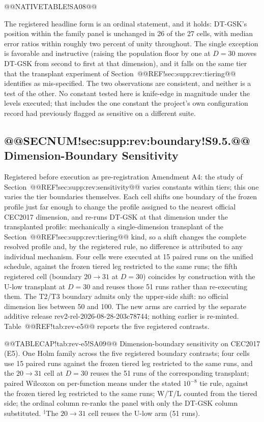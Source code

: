 \documentclass[10pt,a4paper]{article}
\newcommand{\dtgsk}{DT-GSK}
\begin{document}
@@NATIVETABLE!SA08@@




The registered headline form is an ordinal statement, and it holds: \dtgsk{}'s
position within the family panel is unchanged in 26 of the 27 cells, with median
error ratios within roughly two percent of unity throughout.  The single
exception is favorable and instructive (raising the population floor by one
at $D = 30$ moves \dtgsk{} from second to first at that dimension), and it
falls on the same tier that the transplant experiment of
Section~@@REF!sec:supp:rev:tiering@@ identifies as mis-specified.  The two
observations are consistent, and neither is a test of the other.  No constant
tested here is knife-edge in magnitude under the levels executed; that
includes the one constant the project's own configuration record had
previously flagged as sensitive on a different suite.


\subsection{@@SECNUM!sec:supp:rev:boundary!S9.5.@@ Dimension-Boundary Sensitivity}\label{sec:supp:rev:boundary}

Registered before execution as pre-registration Amendment A4: the study of
Section~@@REF!sec:supp:rev:sensitivity@@ varies constants within tiers; this
one varies the tier boundaries themselves.  Each cell shifts one boundary of the frozen
profile just far enough to change the profile assigned to the nearest official
CEC2017 dimension, and re-runs \dtgsk{} at that dimension under the
transplanted profile: mechanically a single-dimension transplant of the
Section~@@REF!sec:supp:rev:tiering@@ kind, so a shift changes the complete
resolved profile and, by the registered rule, no difference is attributed to
any individual mechanism.  Four cells were executed at 15 paired runs on the
unified schedule, against the frozen tiered leg restricted to the same runs;
the fifth registered cell (boundary $20 \to 31$ at $D = 30$) coincides by
construction with the U-low transplant at $D = 30$ and reuses those 51 runs
rather than re-executing them.  The T2/T3 boundary admits only the upper-side
shift: no official dimension lies between 50 and 100.  The new arms are
carried by the separate additive release rev2-rel-2026-08-28-203c78744;
nothing earlier is re-minted.  Table~@@REF!tab:rev-e5@@ reports the five
registered contrasts.




@@TABLECAP!tab:rev-e5!SA09@@ Dimension-boundary sensitivity on CEC2017 (E5).  One Holm family
across the five registered boundary contrasts; four cells use 15 paired runs
against the frozen tiered leg restricted to the same runs, and the $20 \to 31$
cell at $D = 30$ reuses the 51 runs of the corresponding transplant; paired
Wilcoxon on
per-function means under the stated $10^{-8}$ tie rule, against the frozen
tiered leg restricted to the same runs; W/T/L counted from the tiered side;
the ordinal column re-ranks the panel with only the \dtgsk{} column
substituted.  $^{\ddagger}$The $20 \to 31$ cell reuses the U-low arm (51
runs).
\end{document}
